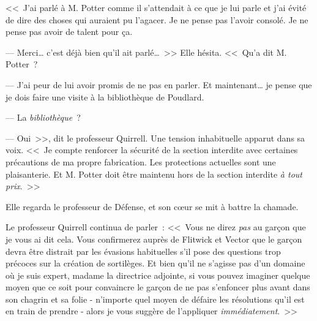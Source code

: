 <<~J'ai parlé à M. Potter comme il s'attendait à ce que je lui parle et j'ai évité de dire des choses qui auraient pu l'agacer. Je ne pense pas l'avoir consolé. Je ne pense pas avoir de talent pour ça.

--- Merci… c'est déjà bien qu'il ait parlé…~>> Elle hésita. <<~Qu'a dit M. Potter~?

--- J'ai peur de lui avoir promis de ne pas en parler. Et maintenant… je pense que je dois faire une visite à la bibliothèque de Poudlard.

--- La \emph{bibliothèque}~?

--- Oui~>>, dit le professeur Quirrell. Une tension inhabituelle apparut dans sa voix. <<~Je compte renforcer la sécurité de la section interdite avec certaines précautions de ma propre fabrication. Les protections actuelles sont une plaisanterie. Et M. Potter doit être maintenu hors de la section interdite \emph{à tout prix}.~>>

Elle regarda le professeur de Défense, et son cœur se mit à battre la chamade.

Le professeur Quirrell continua de parler~: <<~Vous ne direz \emph{pas} au garçon que je vous ai dit cela. Vous confirmerez auprès de Flitwick et Vector que le garçon devra être distrait par les évasions habituelles s'il pose des questions trop précoces sur la création de sortilèges. Et bien qu'il ne s'agisse pas d'un domaine où je suis expert, madame la directrice adjointe, si vous pouvez imaginer quelque moyen que ce soit pour convaincre le garçon de ne pas s'enfoncer plus avant dans son chagrin et sa folie - n'importe quel moyen de défaire les résolutions qu'il est en train de prendre - alors je vous suggère de l'appliquer \emph{immédiatement}.~>> 
